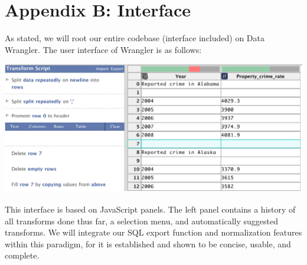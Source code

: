 \documentclass{../sty/acm_proc_article-sp}
\begin{document}
\section*{Appendix B: Interface}

As stated, we will root our entire codebase (interface included) on Data Wrangler. The user interface of Wrangler is as follows:

\includegraphics[scale=.44]{../img/wrangler_gui}

This interface is based on JavaScript panels. The left panel contains a history of all transforms done thus far, a selection menu, and automatically suggested transforms. We will integrate our SQL export function and normalization features within this paradigm, for it is established and shown to be concise, usable, and complete.


\newpage




\end{document}

